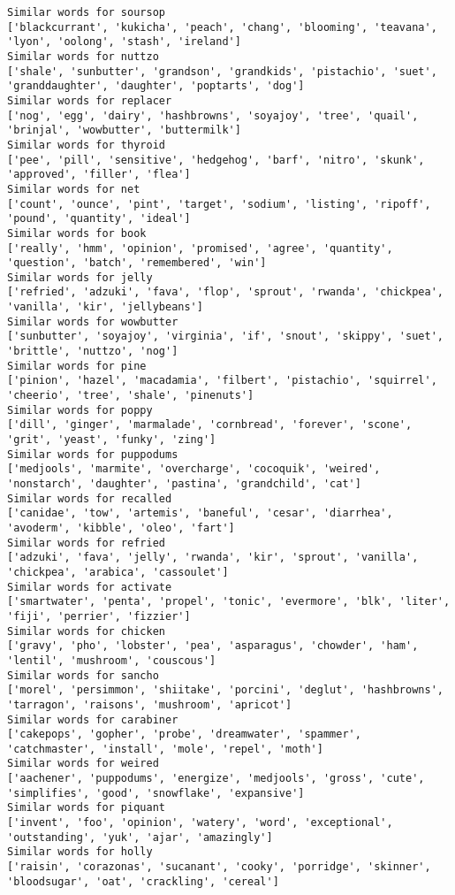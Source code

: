 \documentclass[11pt]{article}
\begin{document}
\begin{Verbatim}[commandchars=\\\{\}]
Similar words for soursop
['blackcurrant', 'kukicha', 'peach', 'chang', 'blooming', 'teavana', 'lyon', 'oolong', 'stash', 'ireland']
Similar words for nuttzo
['shale', 'sunbutter', 'grandson', 'grandkids', 'pistachio', 'suet', 'granddaughter', 'daughter', 'poptarts', 'dog']
Similar words for replacer
['nog', 'egg', 'dairy', 'hashbrowns', 'soyajoy', 'tree', 'quail', 'brinjal', 'wowbutter', 'buttermilk']
Similar words for thyroid
['pee', 'pill', 'sensitive', 'hedgehog', 'barf', 'nitro', 'skunk', 'approved', 'filler', 'flea']
Similar words for net
['count', 'ounce', 'pint', 'target', 'sodium', 'listing', 'ripoff', 'pound', 'quantity', 'ideal']
Similar words for book
['really', 'hmm', 'opinion', 'promised', 'agree', 'quantity', 'question', 'batch', 'remembered', 'win']
Similar words for jelly
['refried', 'adzuki', 'fava', 'flop', 'sprout', 'rwanda', 'chickpea', 'vanilla', 'kir', 'jellybeans']
Similar words for wowbutter
['sunbutter', 'soyajoy', 'virginia', 'if', 'snout', 'skippy', 'suet', 'brittle', 'nuttzo', 'nog']
Similar words for pine
['pinion', 'hazel', 'macadamia', 'filbert', 'pistachio', 'squirrel', 'cheerio', 'tree', 'shale', 'pinenuts']
Similar words for poppy
['dill', 'ginger', 'marmalade', 'cornbread', 'forever', 'scone', 'grit', 'yeast', 'funky', 'zing']
Similar words for puppodums
['medjools', 'marmite', 'overcharge', 'cocoquik', 'weired', 'nonstarch', 'daughter', 'pastina', 'grandchild', 'cat']
Similar words for recalled
['canidae', 'tow', 'artemis', 'baneful', 'cesar', 'diarrhea', 'avoderm', 'kibble', 'oleo', 'fart']
Similar words for refried
['adzuki', 'fava', 'jelly', 'rwanda', 'kir', 'sprout', 'vanilla', 'chickpea', 'arabica', 'cassoulet']
Similar words for activate
['smartwater', 'penta', 'propel', 'tonic', 'evermore', 'blk', 'liter', 'fiji', 'perrier', 'fizzier']
Similar words for chicken
['gravy', 'pho', 'lobster', 'pea', 'asparagus', 'chowder', 'ham', 'lentil', 'mushroom', 'couscous']
Similar words for sancho
['morel', 'persimmon', 'shiitake', 'porcini', 'deglut', 'hashbrowns', 'tarragon', 'raisons', 'mushroom', 'apricot']
Similar words for carabiner
['cakepops', 'gopher', 'probe', 'dreamwater', 'spammer', 'catchmaster', 'install', 'mole', 'repel', 'moth']
Similar words for weired
['aachener', 'puppodums', 'energize', 'medjools', 'gross', 'cute', 'simplifies', 'good', 'snowflake', 'expansive']
Similar words for piquant
['invent', 'foo', 'opinion', 'watery', 'word', 'exceptional', 'outstanding', 'yuk', 'ajar', 'amazingly']
Similar words for holly
['raisin', 'corazonas', 'sucanant', 'cooky', 'porridge', 'skinner', 'bloodsugar', 'oat', 'crackling', 'cereal']

\end{Verbatim}
\end{document}
